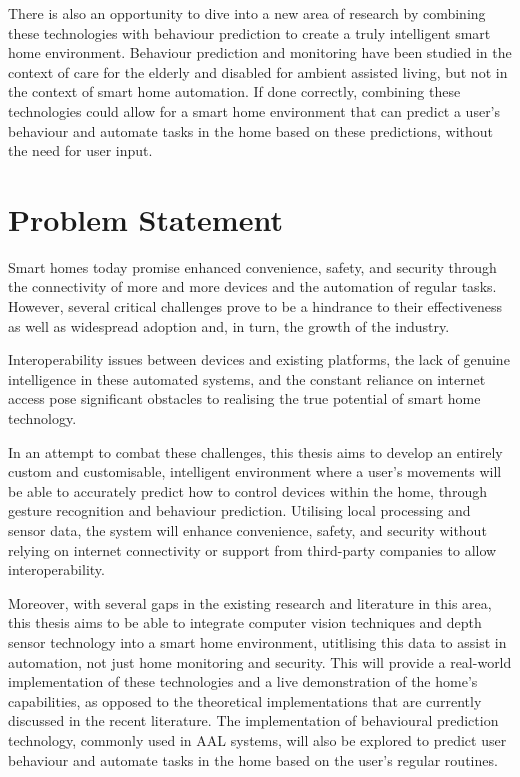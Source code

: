 There is also an opportunity to dive into a new area of research by combining these technologies with behaviour prediction to create a truly intelligent smart home environment.
Behaviour prediction and monitoring have been studied in the context of care for the elderly and disabled for ambient assisted living, but not in the context of smart home automation.
If done correctly, combining these technologies could allow for a smart home environment that can predict a user's behaviour and automate tasks in the home based on these predictions, without the need for user input.

\section{Problem Statement}
Smart homes today promise enhanced convenience, safety, and security through the connectivity of more and more devices and the automation of regular tasks.
However, several critical challenges prove to be a hindrance to their effectiveness as well as widespread adoption and, in turn, the growth of the industry.

Interoperability issues between devices and existing platforms, the lack of genuine intelligence in these automated systems, and the constant reliance on internet access pose significant obstacles to realising the true potential of smart home technology.

In an attempt to combat these challenges, this thesis aims to develop an entirely custom and customisable, intelligent environment where a user's movements will be able to accurately predict how to control devices within the home, through gesture recognition and behaviour prediction.
Utilising local processing and sensor data, the system will enhance convenience, safety, and security without relying on internet connectivity or support from third-party companies to allow interoperability.

Moreover, with several gaps in the existing research and literature in this area, this thesis aims to be able to integrate computer vision techniques and depth sensor technology into a smart home environment, utitlising this data to assist in automation, not just home monitoring and security.
This will provide a real-world implementation of these technologies and a live demonstration of the home's capabilities, as opposed to the theoretical implementations that are currently discussed in the recent literature.
The implementation of behavioural prediction technology, commonly used in AAL systems, will also be explored to predict user behaviour and automate tasks in the home based on the user's regular routines.

